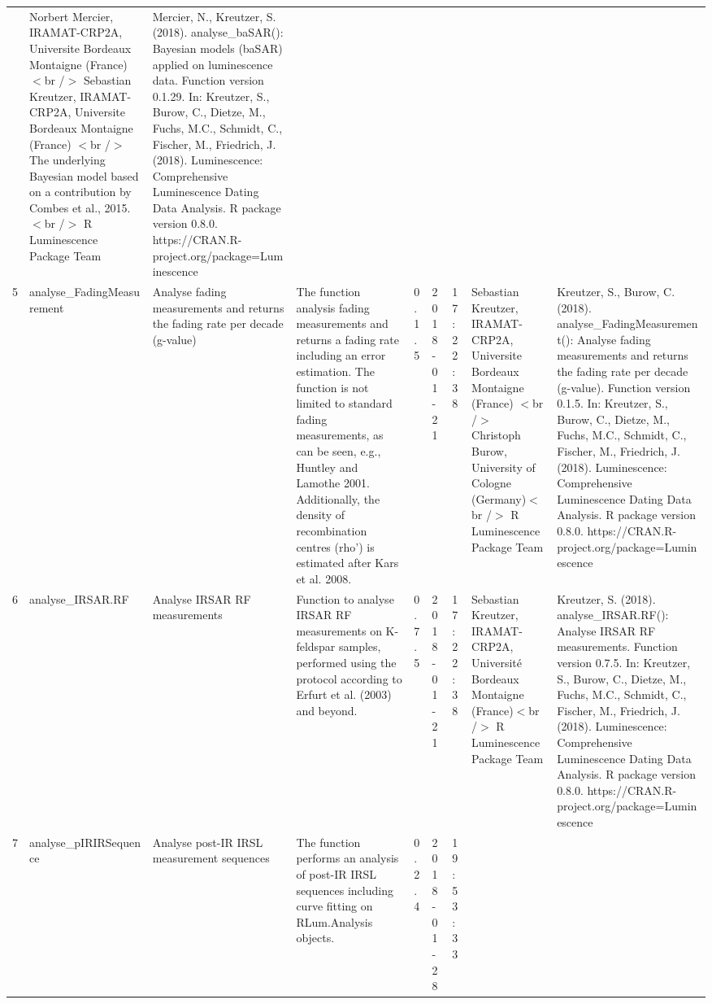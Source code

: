 \begin{table}[ht]
\begin{tabular}{rllllllll}
 & Norbert Mercier, IRAMAT-CRP2A, Universite Bordeaux Montaigne (France)  $<$br /$>$ Sebastian Kreutzer, IRAMAT-CRP2A, Universite Bordeaux Montaigne (France)  $<$br /$>$ The underlying Bayesian model based on a contribution by Combes et al., 2015.$<$br /$>$  R Luminescence Package Team & Mercier, N., Kreutzer, S. (2018). analyse\_baSAR(): Bayesian models (baSAR) applied on luminescence data. Function version 0.1.29. In: Kreutzer, S., Burow, C., Dietze, M., Fuchs, M.C., Schmidt, C., Fischer, M., Friedrich, J. (2018). Luminescence: Comprehensive Luminescence Dating Data Analysis. R package version 0.8.0. https://CRAN.R-project.org/package=Luminescence
 \\ 
  5 & analyse\_FadingMeasurement & Analyse fading measurements and returns the fading rate per decade (g-value) & The function analysis fading measurements and returns a fading rate including an error estimation. The function is not limited to standard fading measurements, as can be seen, e.g., Huntley and Lamothe 2001. Additionally, the density of recombination centres (rho') is estimated after Kars et al. 2008. & 0.1.5 & 2018-01-21 & 17:22:38
 & Sebastian Kreutzer, IRAMAT-CRP2A, Universite Bordeaux Montaigne (France)  $<$br /$>$ Christoph Burow, University of Cologne (Germany)$<$br /$>$  R Luminescence Package Team & Kreutzer, S., Burow, C. (2018). analyse\_FadingMeasurement(): Analyse fading measurements and returns the fading rate per decade (g-value). Function version 0.1.5. In: Kreutzer, S., Burow, C., Dietze, M., Fuchs, M.C., Schmidt, C., Fischer, M., Friedrich, J. (2018). Luminescence: Comprehensive Luminescence Dating Data Analysis. R package version 0.8.0. https://CRAN.R-project.org/package=Luminescence
 \\ 
  6 & analyse\_IRSAR.RF & Analyse IRSAR RF measurements & Function to analyse IRSAR RF measurements on K-feldspar samples, performed using the protocol according to Erfurt et al. (2003) and beyond. & 0.7.5 & 2018-01-21 & 17:22:38
 & Sebastian Kreutzer, IRAMAT-CRP2A, Université Bordeaux Montaigne (France)$<$br /$>$  R Luminescence Package Team & Kreutzer, S. (2018). analyse\_IRSAR.RF(): Analyse IRSAR RF measurements. Function version 0.7.5. In: Kreutzer, S., Burow, C., Dietze, M., Fuchs, M.C., Schmidt, C., Fischer, M., Friedrich, J. (2018). Luminescence: Comprehensive Luminescence Dating Data Analysis. R package version 0.8.0. https://CRAN.R-project.org/package=Luminescence
 \\ 
  7 & analyse\_pIRIRSequence & Analyse post-IR IRSL measurement sequences & The function performs an analysis of post-IR IRSL sequences including curve fitting on  RLum.Analysis  objects. & 0.2.4 & 2018-01-28 & 19:53:33

\end{tabular}
\end{table}
